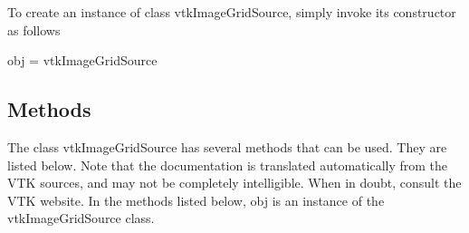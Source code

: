 To create an instance of class vtk\-Image\-Grid\-Source, simply invoke its constructor as follows \begin{DoxyVerb}  obj = vtkImageGridSource
\end{DoxyVerb}
 \hypertarget{vtkwidgets_vtkxyplotwidget_Methods}{}\subsection{Methods}\label{vtkwidgets_vtkxyplotwidget_Methods}
The class vtk\-Image\-Grid\-Source has several methods that can be used. They are listed below. Note that the documentation is translated automatically from the V\-T\-K sources, and may not be completely intelligible. When in doubt, consult the V\-T\-K website. In the methods listed below, {\ttfamily obj} is an instance of the vtk\-Image\-Grid\-Source class. 
